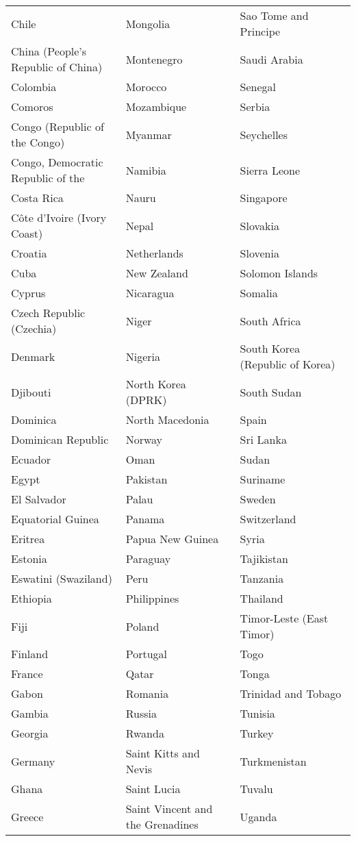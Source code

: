 \documentclass[11pt]{article}
\begin{document}
\begin{longtable}{@{}p{} p{} p{}@{}}
Chile & Mongolia & Sao Tome and Principe \\
China (People's Republic of China) & Montenegro & Saudi Arabia \\
Colombia & Morocco & Senegal \\
Comoros & Mozambique & Serbia \\
Congo (Republic of the Congo) & Myanmar & Seychelles \\
Congo, Democratic Republic of the & Namibia & Sierra Leone \\
Costa Rica & Nauru & Singapore \\
Côte d'Ivoire (Ivory Coast) & Nepal & Slovakia \\
Croatia & Netherlands & Slovenia \\
Cuba & New Zealand & Solomon Islands \\
Cyprus & Nicaragua & Somalia \\
Czech Republic (Czechia) & Niger & South Africa \\
Denmark & Nigeria & South Korea (Republic of Korea) \\
Djibouti & North Korea (DPRK) & South Sudan \\
Dominica & North Macedonia & Spain \\
Dominican Republic & Norway & Sri Lanka \\
Ecuador & Oman & Sudan \\
Egypt & Pakistan & Suriname \\
El Salvador & Palau & Sweden \\
Equatorial Guinea & Panama & Switzerland \\
Eritrea & Papua New Guinea & Syria \\
Estonia & Paraguay & Tajikistan \\
Eswatini (Swaziland) & Peru & Tanzania \\
Ethiopia & Philippines & Thailand \\
Fiji & Poland & Timor-Leste (East Timor) \\
Finland & Portugal & Togo \\
France & Qatar & Tonga \\
Gabon & Romania & Trinidad and Tobago \\
Gambia & Russia & Tunisia \\
Georgia & Rwanda & Turkey \\
Germany & Saint Kitts and Nevis & Turkmenistan \\
Ghana & Saint Lucia & Tuvalu \\
Greece & Saint Vincent and the Grenadines & Uganda \\

\end{longtable}
\end{document}
